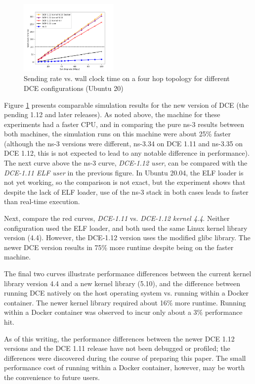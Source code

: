 \documentclass{sig-alternate}
\begin{document}
\begin{figure}[h!]
  \centering
    \includegraphics[width=0.43\textwidth]{figs/rate-vs-time-dce12.png}
  \caption{Sending rate vs. wall clock time on a four hop topology for different DCE configurations (Ubuntu 20)}
  \label{fig:rate-vs-time-u20}
\end{figure}

Figure \ref{fig:rate-vs-time-u20} presents comparable simulation results
for the new version of DCE (the pending 1.12 and later releases).  As noted
above, the machine for these experiments had a faster CPU, and in comparing
the pure ns-3 results between both machines, the simulation runs on this
machine were about 25\% faster (although the ns-3 versions were different,
ns-3.34 on DCE 1.11 and ns-3.35 on DCE 1.12, this is not expected to
lead to any notable difference in performance).  The next curve above
the ns-3 curve, \emph{DCE-1.12 user}, can be compared with the
\emph{DCE-1.11 ELF user} in the previous figure.  In Ubuntu 20.04, the
ELF loader is not yet working, so the comparison is not exact, but the
experiment shows that despite the lack of ELF loader, use of the ns-3
stack in both cases leads to faster than real-time execution.

Next, compare the red curves, \emph{DCE-1.11} vs. \emph{DCE-1.12 kernel 4.4}.
Neither configuration used the ELF loader, and both used the same Linux
kernel library version (4.4).  However, the DCE-1.12 version uses the
modified glibc library.  The newer DCE version results in 75\% more runtime
despite being on the faster machine.  

The final two curves illustrate performance differences between the current
kernel library version 4.4 and a new kernel library (5.10), and the
difference between running DCE natively on the host operating system vs.
running within a Docker container.  The newer kernel library required
about 16\% more runtime.   Running within a Docker container was observed
to incur only about a 3\% performance hit.

As of this writing, the performance differences between the newer DCE 1.12
versions and the DCE 1.11 release have not been debugged
or profiled; the differences were discovered during the course of preparing
this paper.  The small performance cost of running within a Docker container,
however, may be worth the convenience to future users.
\end{document}
